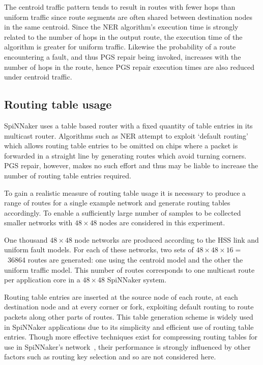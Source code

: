 			The centroid traffic pattern tends to result in routes with fewer hops
			than uniform traffic since route segments are often shared between
			destination nodes in the same centroid.  Since the NER algorithm's
			execution time is strongly related to the number of hops in the output
			route, the execution time of the algorithm is greater for uniform
			traffic.  Likewise the probability of a route encountering a fault, and
			thus PGS repair being invoked, increases with the number of hops in the
			route, hence PGS repair execution times are also reduced under centroid
			traffic.
		
		\subsection{Routing table usage}
			
			SpiNNaker uses a table based router with a fixed quantity of table
			entries in its multicast router. Algorithms such as NER attempt to
			exploit `default routing' which allows routing table entries to be
			omitted on chips where a packet is forwarded in a straight line by
			generating routes which avoid turning corners.  PGS repair, however,
			makes no such effort and thus may be liable to increase the number of
			routing table entries required.
			
			To gain a realistic measure of routing table usage it is necessary to
			produce a range of routes for a single example network and generate
			routing tables accordingly.  To enable a sufficiently large number of
			samples to be collected smaller networks with $48\times48$ nodes are
			considered in this experiment.
			
			One thousand $48\times48$ node networks are produced according to the HSS
			link and uniform fault models. For each of these networks, two sets of
			$48\times48\times16=$~\num{36864} routes are generated: one using the
			centroid model and the other the uniform traffic model. This number of
			routes corresponds to one multicast route per application core in a
			$48\times48$ SpiNNaker system.
			
			Routing table entries are inserted at the source node of each route, at
			each destination node and at every corner or fork, exploiting default
			routing to route packets along other parts of routes. This table
			generation scheme is widely used in SpiNNaker applications due to its
			simplicity and efficient use of routing table entries. Though more
			effective techniques exist for compressing routing tables for use in
			SpiNNaker's network~\cite{mundy16}, their performance is strongly
			influenced by other factors such as routing key selection and so are not
			considered here.
			
